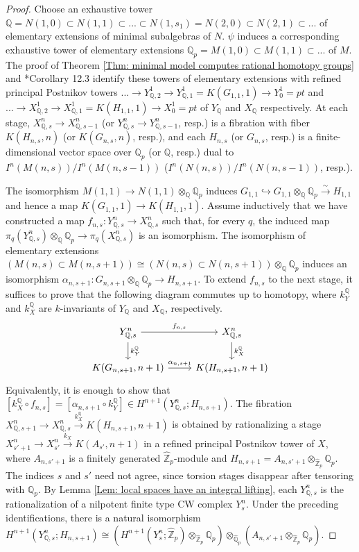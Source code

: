 \documentclass[11pt]{amsart}
\theoremstyle{definition}
\numberwithin{equation}{section}
\numberwithin{equation}{section}
\newcommand\QQ{\mathbb{Q}}
\newcommand\ZZ{\mathbb{Z}}
\begin{document}
\begin{proof}
Choose an exhaustive tower $\QQ=N(1,0)\subset N(1,1)\subset ... \subset N(1,s_1)=N(2,0)\subset N(2,1)\subset ...$ of elementary extensions of minimal subalgebras of $N$. $\psi$ induces a corresponding exhaustive tower of elementary extensions $\QQ_p=M(1,0)\subset M(1,1)\subset ...$ of $M$. The proof of Theorem \ref{Thm: minimal model computes rational homotopy groups} and \cite{MGriffiths-Morgan-rational-homotopy}*{Corollary 12.3} identify these towers of elementary extensions with refined principal Postnikov towers $...\rightarrow Y^1_{\QQ,2}\rightarrow Y^1_{\QQ,1}=K(G_{1,1},1)\rightarrow Y^1_0=pt$ and $...\rightarrow X^1_{\QQ,2} \rightarrow X^1_{\QQ,1}=K(H_{1,1},1)\rightarrow X^1_0=pt$ of $Y_{\QQ}$ and $X_{\QQ}$ respectively. At each stage,  $X^n_{\QQ,s}\rightarrow X^n_{\QQ,s-1}$ (or $Y^n_{\QQ,s}\rightarrow Y^n_{\QQ,s-1}$, resp.) is a fibration with fiber $K(H_{n,s},n)$ (or $K(G_{n,s},n)$, resp.), and each $H_{n,s}$ (or $G_{n,s}$, resp.) is a finite-dimensional vector space over $\QQ_p$ (or $\QQ$, resp.) dual to $I^n(M(n,s))/I^n(M(n,s-1))$ ($I^n(N(n,s))/I^n(N(n,s-1))$, resp.).

The isomorphism $M(1,1)\rightarrow N(1,1)\otimes_{\QQ} \QQ_p$ induces $G_{1,1}\hookrightarrow G_{1,1}\otimes_{\QQ} \QQ_p\xrightarrow{\sim} H_{1,1}$ and hence a map $K(G_{1,1},1)\rightarrow K(H_{1,1},1)$. Assume inductively that we have constructed a map $f_{n,s}:Y^n_{\QQ,s}\rightarrow X^n_{\QQ,s}$ such that, for every $q$, the induced map $\pi_q(Y^n_{\QQ,s})\otimes_{\QQ}\QQ_p\rightarrow \pi_q(X^n_{\QQ,s})$ is an isomorphism. The isomorphism of elementary extensions $(M(n,s)\subset M(n,s+1))\cong (N(n,s)\subset N(n,s+1))\otimes_{\QQ}\QQ_p$ induces an isomorphism $\alpha_{n,s+1}: G_{n,s+1}\otimes_{\QQ} \QQ_p\rightarrow H_{n,s+1}$. To extend $f_{n,s}$ to the next stage, it suffices to prove that the following diagram commutes up to homotopy, where $k^{\QQ}_Y$ and $k^{\QQ}_X$ are $k$-invariants of $Y_{\QQ}$ and $X_{\QQ}$, respectively.
\[
\begin{tikzcd}
 Y^n_{\QQ,s} \arrow[r,"f_{n,s}"] \arrow[d,"k_Y^{\QQ}"] & X^n_{\QQ,s} \arrow[d,"k_X^{\QQ}"] \\
K(G_{n,s+1},n+1) \arrow[r,"\alpha_{n,s+1}"] & K(H_{n,s+1},n+1)   
\end{tikzcd}
\]
Equivalently, it is enough to show that $[k^{\QQ}_X\circ f_{n,s}]=[\alpha_{n,s+1}\circ k^{\QQ}_Y]\in H^{n+1}(Y^n_{\QQ,s};H_{n,s+1})$.   The fibration  $X^n_{\QQ,s+1}\rightarrow X^n_{\QQ,s}\xrightarrow{k^{\QQ}_X}K(H_{n,s+1},n+1)$ is obtained by rationalizing a stage $X^n_{s'+1}\rightarrow X^n_{s'}\xrightarrow{k_{X}} K(A_{s'},n+1)$ in a refined principal Postnikov tower of $X$, where $A_{n,s'+1}$ is a finitely generated $\widehat{\ZZ}_p$-module and $H_{n,s+1}=A_{n,s'+1}\otimes_{\widehat{\ZZ}_p}\QQ_p$. The indices $s$ and $s'$ need not agree, since torsion stages disappear after tensoring with $\QQ_p$. By Lemma \ref{Lem: local spaces have an integral lifting}, each $Y^n_{\QQ,s}$ is the rationalization of a nilpotent finite type CW complex $Y^n_s$. Under the preceding identifications, there is a natural isomorphism $H^{n+1}(Y^n_{\QQ,s};H_{n,s+1})\cong (H^{n+1}(Y^n_s;\widehat{\ZZ}_p)\otimes_{\widehat{\ZZ}_p} \QQ_p)\otimes_{\widehat{\QQ}_p} (A_{n,s'+1}\otimes_{\widehat{\ZZ}_p} \QQ_p)$.


\end{proof}
\end{document}

